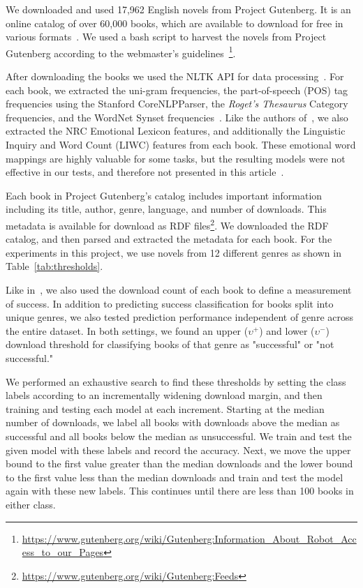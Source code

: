 We downloaded and used 17,962 English novels from Project Gutenberg. It is an online catalog of over 60,000 books, which are available to download for free in various formats~\cite{project-gutenberg}.
We used a bash script to harvest the novels from Project Gutenberg according to the webmaster's guidelines~\cite{gutenberg-script}\footnote{\url{https://www.gutenberg.org/wiki/Gutenberg:Information_About_Robot_Access_to_our_Pages}}.

After downloading the books we used the NLTK API for data processing~\cite{bird_klein_loper_2009}.
For each book, we extracted the uni-gram frequencies, the part-of-speech (POS) tag frequencies using the Stanford CoreNLPParser, the \textit{Roget's Thesaurus} Category frequencies, and the WordNet Synset frequencies~\cite{roget,wordnet,corenlp}.
Like the authors of~\cite{maharjan_emotion}, we also extracted the NRC Emotional Lexicon features, and additionally the Linguistic Inquiry and Word Count (LIWC) features from each book.
These emotional word mappings are highly valuable for some tasks, but the resulting models were not effective in our tests, and therefore not presented in this article~\cite{NRC,LIWC}.

Each book in Project Gutenberg's catalog includes important information including its title, author, genre, language, and number of downloads.
This metadata is available for download as RDF files\footnote{\url{https://www.gutenberg.org/wiki/Gutenberg:Feeds}}.
We downloaded the RDF catalog, and then parsed and extracted the metadata for each book.
For the experiments in this project, we use novels from 12 different genres as shown in Table~\ref{tab:thresholds}.

Like in~\cite{ashok2013}, we also used the download count of each book to define a measurement of success.
In addition to predicting success classification for books split into unique genres, we also tested prediction performance independent of genre across the entire dataset.
In both settings, we found an upper ($\upsilon^+$) and lower ($\upsilon^-$) download threshold for classifying books of that genre as "successful" or "not successful."

% 

We performed an exhaustive search to find these thresholds by setting the class labels according to an incrementally widening download margin, and then training and testing each model at each increment.
Starting at the median number of downloads, we label all books with downloads above the median as successful and all books below the median as unsuccessful.
We train and test the given model with these labels and record the accuracy.
Next, we move the upper bound to the first value greater than the median downloads and the lower bound to the first value less than the median downloads and train and test the model again with these new labels.
This continues until there are less than 100 books in either class.

